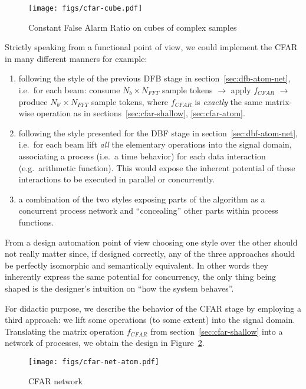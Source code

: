 \documentclass[
  a4paper,
]{article}
\begin{document}
\begin{figure}
\hypertarget{fig:cfar-cube-atom}{%
\centering
\texttt{[image: figs/cfar-cube.pdf]}
\caption{Constant False Alarm Ratio on cubes of complex
samples}\label{fig:cfar-cube-atom}
}
\end{figure}

Strictly speaking from a functional point of view, we could implement
the CFAR in many different manners for example:

\begin{enumerate}
\def\labelenumi{\arabic{enumi}.}
\item
  following the style of the previous DFB stage in
  section~\ref{sec:dfb-atom-net}, i.e.~for each beam: consume
  \(N_{b}\times N_{FFT}\) sample tokens \(\rightarrow\) apply
  \(f_{CFAR}\) \(\rightarrow\) produce \(N_{b'}\times N_{FFT}\) sample
  tokens, where \(f_{CFAR}\) is \emph{exactly} the same matrix-wise
  operation as in sections~\ref{sec:cfar-shallow}, \ref{sec:cfar-atom}.
\item
  following the style presented for the DBF stage in
  section~\ref{sec:dbf-atom-net}, i.e.~for each beam lift \emph{all} the
  elementary operations into the signal domain, associating a process
  (i.e.~a time behavior) for each data interaction (e.g.~arithmetic
  function). This would expose the inherent potential of these
  interactions to be executed in parallel or concurrently.
\item
  a combination of the two styles exposing parts of the algorithm as a
  concurrent process network and ``concealing'' other parts within
  process functions.
\end{enumerate}

From a design automation point of view choosing one style over the other
should not really matter since, if designed correctly, any of the three
approaches should be perfectly isomorphic and semantically equivalent.
In other words they inherently express the same potential for
concurrency, the only thing being shaped is the designer's intuition on
``how the system behaves''.

For didactic purpose, we describe the behavior of the CFAR stage by
employing a third approach: we lift some operations (to some extent)
into the signal domain. Translating the matrix operation \(f_{CFAR}\)
from section~\ref{sec:cfar-shallow} into a network of processes, we
obtain the design in Figure~\ref{fig:cfar-net-atom}.

\begin{figure}
\hypertarget{fig:cfar-net-atom}{%
\centering
\texttt{[image: figs/cfar-net-atom.pdf]}
\caption{CFAR network}\label{fig:cfar-net-atom}
}
\end{figure}
\end{document}
